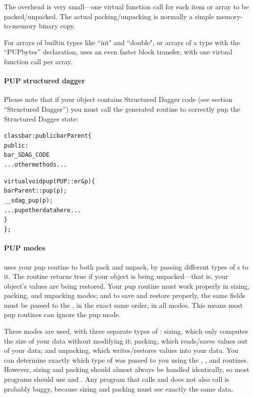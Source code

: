 \label{sec:pupoverhead}

The  overhead is very small---one virtual function call
for each item or array to be packed/unpacked.  The actual packing/unpacking is
normally a simple memory-to-memory binary copy. 

For arrays of builtin types like ``int" and ``double", or arrays of a type 
with the ``PUPbytes'' declaration,  uses an even faster block 
transfer, with one virtual function call per array.


\paragraph{PUP structured dagger}

\label{sec:pupsdag}

Please note that if your object contains Structured Dagger code (see section ``Structured Dagger'') you must call the generated routine  to correctly pup the Structured Dagger state:

\begin{alltt}
class bar : public barParent \{
 public:
    bar_SDAG_CODE 
    ...other methods...

    virtual void pup(PUP::er& p) \{
      barParent::pup(p);
      __sdag_pup(p);
      ...pup other data here...
    \}
\};
\end{alltt}



\paragraph{PUP modes}

\label{sec:pupmodes}

\charmpp{} uses your pup routine to both pack and unpack, 
by passing different types of s to it.  The routine
 returns true if your object is being unpacked---that 
is, your object's values are being restored.  Your pup routine must
work properly in sizing, packing, and unpacking modes; and
to save and restore properly, the same fields must be passed 
to the , in the exact same order, in all modes.
This means most pup routines can ignore the pup mode.

Three modes are used, with three separate types of : 
sizing, which only computes the size of your data without modifying it;
packing, which reads/saves values out of your data; and unpacking,
which writes/restores values into your data.  You can determine
exactly which type of  was passed to you using the
, , and 
routines. However, sizing and packing should almost always be 
handled identically, so most programs should use 
and .  Any program that calls  
and does not also call  is probably buggy, because
sizing and packing must see exactly the same data.


